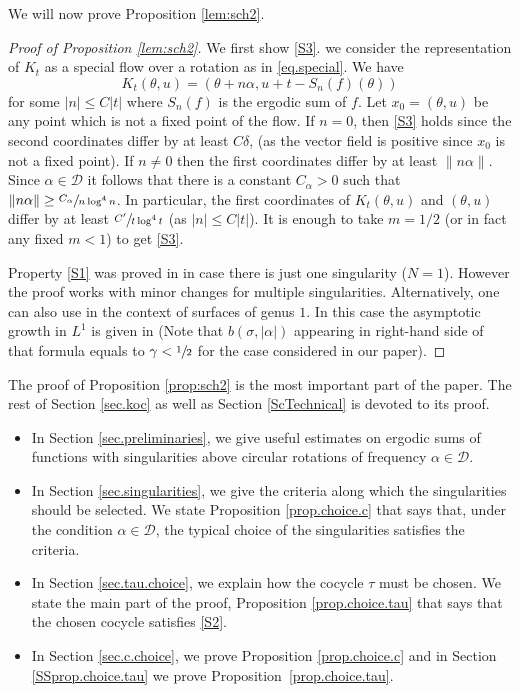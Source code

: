\documentclass[JEP,XML,SOM,Unicode,NoFloatCountersInSection]{cedram}
\newcommand\cD{\mathcal{D}}
\theoremstyle{definition}
\theoremstyle{plain}
\begin{document}
We will now prove Proposition \ref{lem:sch2}.
\begin{proof}[Proof of Proposition \ref{lem:sch2}] We first show \eqref{S3}. we consider the representation of $K_t$ as a special flow over a rotation as in \eqref{eq.special}.
We have
\[
K_t(\theta, u)=(\theta+n\alpha, u+t-S_n(f)(\theta))
\]
for some $|n|\leq C |t|$ where $S_n(f)$ is the ergodic sum of $f$. Let $x_0=(\theta,u)$ be any point which is not a fixed point of the flow.
If $n=0$, then \eqref{S3} holds since the second coordinates differ by at least $C\delta$, (as the vector field is positive since $x_0$ is not a fixed point).
{ If $n\neq 0$ then the first coordinates differ by at least $\|n\alpha\|$. Since $\alpha\in \cD$ it follows that there is a constant $C_\alpha>0$ such that $\|n\alpha\|\geq \sfrac{C_\alpha}{n \log^4 n}$. In particular, the first coordinates of $K_t(\theta,u)$ and $(\theta,u)$ differ by at least $\sfrac{C'}{t \log^4 t}$ (as $|n|\leq C|t|$). It is enough to take $m=1/2$ (or in fact any fixed $m<1$) to get \eqref{S3}.}

Property \eqref{S1} was proved in \cite{DDKN} in case there is just one singularity (\ie $N=1$). However the proof works with minor changes for multiple singularities. Alternatively, one can also use \cite[Th.\,1.1]{FM} in the context of surfaces of genus $1$. In this case the asymptotic growth in $L^1$ is given in \cite[Eq.\,(1.5)]{FM} ({Note that $b(\sigma,|\alpha|)$ appearing in right-hand side of that formula
equals to $\gamma<\sfrac{1}{2}$ for the case considered in our paper}).
\end{proof}

The proof of Proposition \ref{prop:sch2} is the most important part of the paper. The rest of Section \ref{sec.koc} as well as Section \ref{ScTechnical} is devoted to its proof.

\begin{itemize}
\item
In Section \ref{sec.preliminaries}, we give useful estimates on ergodic sums of functions with singularities above circular rotations of frequency $\alpha \in \cD$.

\item
In Section \ref{sec.singularities}, we give the criteria along which the singularities should be selected. We state Proposition \ref{prop.choice.c} that says that, under the condition $\alpha \in \cD$, the typical choice of the singularities satisfies the criteria.

\item
In Section \ref{sec.tau.choice}, we explain how the cocycle $\tau$ must be chosen. We state the main part of the proof, Proposition \ref{prop.choice.tau} that says that the chosen cocycle satisfies \eqref{S2}.

\item
In Section \ref{sec.c.choice}, we prove Proposition \ref{prop.choice.c} and in Section \ref{SSprop.choice.tau} we prove Proposition~\ref{prop.choice.tau}.
\end{itemize}
\end{document}
